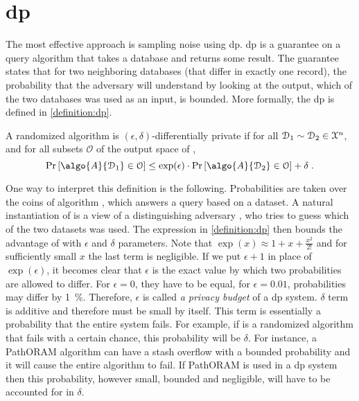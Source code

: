 	\section{\texorpdfstring{\acrlong{dp}}{Differential Privacy}}

		The most effective approach is sampling noise using \acrfull{dp}.
		\acrshort{dp} is a guarantee on a query algorithm that takes a database and returns some result.
		The guarantee states that for two neighboring databases (that differ in exactly one record), the probability that the adversary will understand by looking at the output, which of the two databases was used as an input, is bounded.
		More formally, the \acrlong{dp} is defined in \cref{definition:dp}.

		\begin{definition}\label{definition:dp}
			A randomized algorithm  is $(\epsilon, \delta)$-differentially private if for all $\mathcal{D}_1 \sim \mathcal{D}_2 \in \mathcal{X}^{n}$, and for all subsets $\mathcal{O}$ of the output space of ,
			\[
				\probability{ \algo{A}{ \database_1 } \in \mathcal{O} } \leq \exp(\epsilon) \cdot \probability{ \algo{A}{ \database_2 } \in \mathcal{O} } + \delta \; .
			\]
		\end{definition}

		One way to interpret this definition is the following.
		Probabilities are taken over the coins of algorithm , which answers a query based on a dataset.
		A natural instantiation of  is a view of a distinguishing adversary \adversary{}, who tries to guess which of the two datasets was used.
		The expression in \cref{definition:dp} then bounds the advantage of \adversary{} with $\epsilon$ and $\delta$ parameters.
		Note that $\exp( x ) \approx 1 + x + \frac{x^2}{2!}$ and for sufficiently small $x$ the last term is negligible.
		If we put $\epsilon + 1$ in place of $\exp( \epsilon )$, it becomes clear that $\epsilon$ is the exact value by which two probabilities are allowed to differ.
		For $\epsilon = 0$, they have to be equal, for $\epsilon = 0.01$, probabilities may differ by \SI{1}{\percent}.
		Therefore, $\epsilon$ is called \emph{a privacy budget} of a \acrshort{dp} system.
		$\delta$ term is additive and therefore must be small by itself.
		This term is essentially a probability that the entire system fails.
		For example, if  is a randomized algorithm that fails with a certain chance, this probability will be $\delta$.
		For instance, a PathORAM \cite{path-oram} algorithm can have a stash overflow with a bounded probability \cite[Theorem 1]{path-oram} and it will cause the entire algorithm to fail.
		If PathORAM is used in a \acrshort{dp} system then this probability, however small, bounded and negligible, will have to be accounted for in $\delta$.

